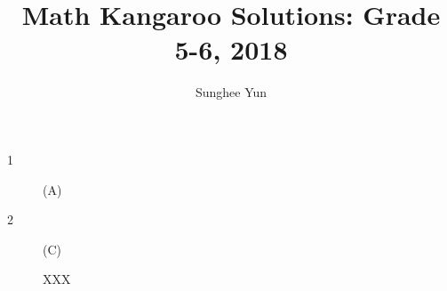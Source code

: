 \documentclass{article}
\title{Math Kangaroo Solutions: Grade 5-6, 2018}
\author{Sunghee Yun}
\begin{document}
\maketitle

\begin{description}
\item [1] (A)
\item [2] (C)
\begin{solution}
XXX
\end{solution}

\end{description}
\end{document}
